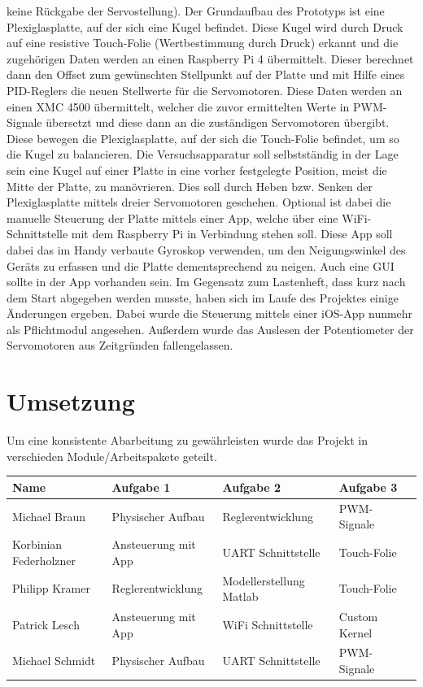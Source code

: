 \documentclass[12pt,a4paper,bibliography=totoc,listof=totoc]{scrartcl}
\begin{document}
keine Rückgabe der Servostellung). Der Grundaufbau des Prototyps ist eine Plexiglasplatte, auf der sich 
eine Kugel befindet. Diese Kugel wird durch Druck auf eine resistive Touch-Folie (Wertbestimmung durch 
Druck) erkannt und die zugehörigen Daten werden an einen Raspberry Pi 4 übermittelt. Dieser berechnet dann 
den Offset zum gewünschten Stellpunkt auf der Platte und mit Hilfe eines PID-Reglers die neuen Stellwerte 
für die Servomotoren. Diese Daten werden an einen XMC 4500 übermittelt, welcher die zuvor ermittelten Werte 
in PWM-Signale übersetzt und diese dann an die zuständigen Servomotoren übergibt. Diese bewegen die 
Plexiglasplatte, auf der sich die Touch-Folie befindet, um so die Kugel zu balancieren.
Die Versuchsapparatur soll selbstständig in der Lage sein eine Kugel auf einer Platte in eine vorher 
festgelegte Position, meist die Mitte der Platte, zu manövrieren. Dies soll durch Heben bzw. Senken der 
Plexiglasplatte mittels dreier Servomotoren geschehen. Optional ist dabei die manuelle Steuerung der 
Platte mittels einer App, welche über eine WiFi-Schnittstelle mit dem Raspberry Pi in Verbindung stehen 
soll. Diese App soll dabei das im Handy verbaute Gyroskop verwenden, um den Neigungswinkel des Geräts zu 
erfassen und die Platte dementsprechend zu neigen. Auch eine GUI sollte in der App vorhanden sein.
Im Gegensatz zum Lastenheft, dass kurz nach dem Start abgegeben werden musste, haben sich im Laufe des 
Projektes einige Änderungen ergeben. Dabei wurde die Steuerung mittels einer iOS-App nunmehr als 
Pflichtmodul angesehen. Außerdem wurde das Auslesen der Potentiometer der Servomotoren aus Zeitgründen 
fallengelassen.
\pagebreak
\section {Umsetzung}
Um eine konsistente Abarbeitung zu gewährleisten wurde das Projekt in verschieden Module/Arbeitspakete 
geteilt.

\begin{tabularx}{\textwidth}{p{}|X|X|X|X|}
Name 					& Aufgabe 1 			& Aufgabe 2 				& Aufgabe 3  \\
\hline
Michael Braun			& Physischer Aufbau		& Reglerentwicklung			& PWM-Signale \\
\hline
\hline
Korbinian Federholzner	& Ansteuerung mit App	& UART Schnittstelle		& Touch-Folie \\
\hline
\hline
Philipp Kramer			&Reglerentwicklung		& Modellerstellung Matlab	& Touch-Folie\\
\hline
\hline
Patrick Lesch			& Ansteuerung mit App	& WiFi Schnittstelle		& Custom Kernel\\
\hline
\hline
Michael Schmidt			& Physischer Aufbau		& UART Schnittstelle		& PWM-Signale\\
\hline
\end{tabularx}
\end{document}

